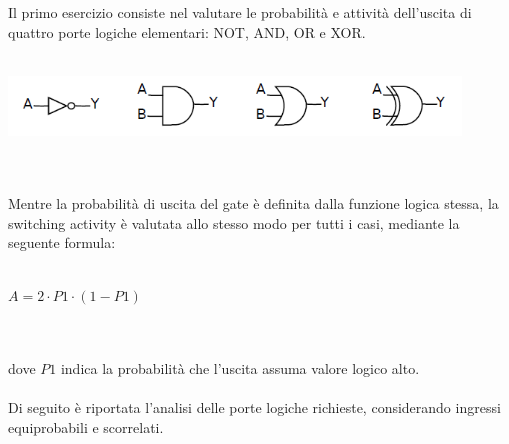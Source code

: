 \documentclass[11pt,  english, makeidx, a4paper, titlepage, oneside]{book}
\begin{document}
Il primo esercizio consiste nel valutare le probabilità e attività dell'uscita di 
quattro porte logiche elementari: NOT, AND, OR e XOR.
\\\\
\centerline{\includegraphics[width=12cm]{./img/Lab_1/Es_1/Porte.png}}
\\\\
Mentre la probabilità di uscita del gate è definita dalla funzione logica
stessa, la switching activity è valutata allo stesso modo per tutti i casi, 
mediante la seguente formula:
\\\\
	\centerline{$A = 2 \cdot P1 \cdot (1-P1)$}
\\\\
dove $P1$ indica la probabilità che l'uscita assuma valore logico alto.\\\\
Di seguito è riportata l'analisi delle porte logiche richieste, considerando 
ingressi equiprobabili e scorrelati.
\end{document}
